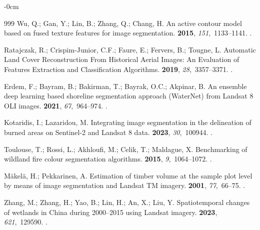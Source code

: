 \documentclass[analytics,article,accept,pdftex,moreauthors]{Definitions/mdpi}
\begin{document}
\begin{adjustwidth}{-\extralength}{0cm}
\begin{thebibliography}{999}
Wu, Q.; Gan, Y.; Lin, B.; Zhang, Q.; Chang, H.
\newblock An active contour model based on fused texture features for image
  segmentation.
 {\bf 2015}, {\em 151},~1133--1141.
.

Ratajczak, R.; Crispim-Junior, C.F.; Faure, E.; Fervers, B.; Tougne, L.
\newblock Automatic Land Cover Reconstruction From Historical Aerial Images: An
  Evaluation of Features Extraction and Classification Algorithms.
 {\bf 2019}, {\em
  28},~3357--3371.
.

Erdem, F.; Bayram, B.; Bakirman, T.; Bayrak, O.C.; Akpinar, B.
\newblock An ensemble deep learning based shoreline segmentation approach
  (WaterNet) from Landsat 8 OLI images.
 {\bf 2021}, {\em 67},~964--974.
.

Kotaridis, I.; Lazaridou, M.
\newblock Integrating image segmentation in the delineation of burned areas on
  Sentinel-2 and Landsat 8 data.
 {\bf
  2023}, {\em 30},~100944.
.

Toulouse, T.; Rossi, L.; Akhloufi, M.; Celik, T.; Maldague, X.
\newblock Benchmarking of wildland fire colour segmentation algorithms.
 {\bf 2015}, {\em 9},~1064--1072.
.

Mäkelä, H.; Pekkarinen, A.
\newblock Estimation of timber volume at the sample plot level by means of
  image segmentation and Landsat TM imagery.
 {\bf 2001}, {\em 77},~66--75.
.

Zhang, M.; Zhang, H.; Yao, B.; Lin, H.; An, X.; Liu, Y.
\newblock Spatiotemporal changes of wetlands in China during 2000–2015 using
  Landsat imagery.
 {\bf 2023}, {\em 621},~129590.
.


\end{thebibliography}
\end{adjustwidth}
\end{document}
